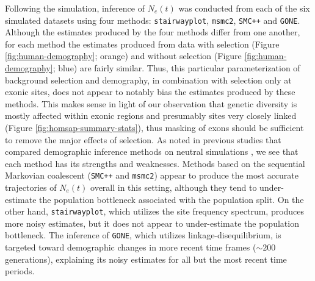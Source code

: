\documentclass[hidelinks]{article}
\newcommand{\msmc}{\texttt{msmc2}\xspace}
\newcommand{\stairway}{\texttt{stairwayplot}\xspace}
\newcommand{\gone}{\texttt{GONE}\xspace}
\newcommand{\smcpp}{\texttt{SMC++}\xspace}
\begin{document}
    
    Following the simulation, inference of $N_e(t)$ was conducted from each of the six simulated datasets using four methods:
    \stairway \citep{liu2020stairway}, \msmc \citep{Schiffels2020}, \smcpp \citep{terhorst2017robust} and \gone \citep{santiago2020recent}.
    Although the estimates produced by the four methods differ from one another,
    for each method the estimates produced from data with selection (Figure
    \ref{fig:human-demography}; orange) and without selection (Figure
    \ref{fig:human-demography}; blue) are fairly similar.
    Thus, this particular parameterization of background selection and demography,
    in combination with selection only at exonic sites, %
    does not appear to notably bias the estimates produced by these methods.
    This makes sense in light of our observation that genetic diversity is mostly affected
    within exonic regions and presumably sites very closely linked (Figure \ref{fig:homsap-summary-stats}),
    thus masking of exons should be sufficient to remove the major effects of selection.
    As noted in previous studies that compared demographic inference methods
    on neutral simulations \citep{adrion2020community},
    we see that each method has its strengths and weaknesses.
    Methods based on the sequential Markovian coalescent (\smcpp and \msmc)
    appear to produce the most accurate trajectories of $N_e(t)$ overall
    in this setting, although they tend to under-estimate the population
    bottleneck associated with the population split.
    On the other hand, \stairway, which utilizes the site frequency spectrum,
    produces more noisy estimates,
    but it does not appear to under-estimate the population bottleneck.
    The inference of \gone, which utilizes linkage-disequilibrium,
    is targeted toward demographic changes in more recent time frames ($\sim 200$ generations),
    explaining its noisy estimates for all but the most recent time periods.
\end{document}
